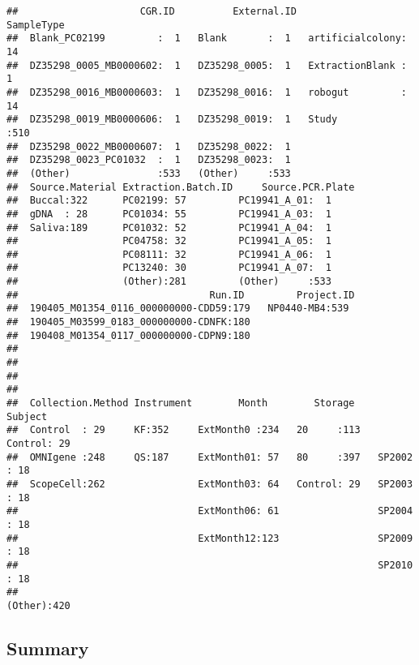 \documentclass[]{article}
\begin{document}
\begin{verbatim}
##                     CGR.ID          External.ID             SampleType 
##  Blank_PC02199         :  1   Blank       :  1   artificialcolony: 14  
##  DZ35298_0005_MB0000602:  1   DZ35298_0005:  1   ExtractionBlank :  1  
##  DZ35298_0016_MB0000603:  1   DZ35298_0016:  1   robogut         : 14  
##  DZ35298_0019_MB0000606:  1   DZ35298_0019:  1   Study           :510  
##  DZ35298_0022_MB0000607:  1   DZ35298_0022:  1                         
##  DZ35298_0023_PC01032  :  1   DZ35298_0023:  1                         
##  (Other)               :533   (Other)     :533                         
##  Source.Material Extraction.Batch.ID     Source.PCR.Plate
##  Buccal:322      PC02199: 57         PC19941_A_01:  1    
##  gDNA  : 28      PC01034: 55         PC19941_A_03:  1    
##  Saliva:189      PC01032: 52         PC19941_A_04:  1    
##                  PC04758: 32         PC19941_A_05:  1    
##                  PC08111: 32         PC19941_A_06:  1    
##                  PC13240: 30         PC19941_A_07:  1    
##                  (Other):281         (Other)     :533    
##                                 Run.ID         Project.ID 
##  190405_M01354_0116_000000000-CDD59:179   NP0440-MB4:539  
##  190405_M03599_0183_000000000-CDNFK:180                   
##  190408_M01354_0117_000000000-CDPN9:180                   
##                                                           
##                                                           
##                                                           
##                                                           
##  Collection.Method Instrument        Month        Storage       Subject   
##  Control  : 29     KF:352     ExtMonth0 :234   20     :113   Control: 29  
##  OMNIgene :248     QS:187     ExtMonth01: 57   80     :397   SP2002 : 18  
##  ScopeCell:262                ExtMonth03: 64   Control: 29   SP2003 : 18  
##                               ExtMonth06: 61                 SP2004 : 18  
##                               ExtMonth12:123                 SP2009 : 18  
##                                                              SP2010 : 18  
##                                                              (Other):420
\end{verbatim}

\subsection{Summary}\label{summary}
\end{document}

